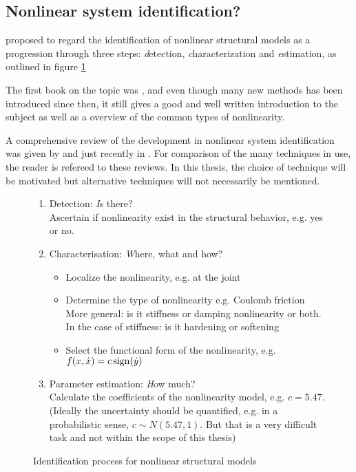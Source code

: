 \subsection{Nonlinear system identification?}
\label{sec:nonl-syst-ident}

\textcite{kerschen2006a} proposed to regard the identification of nonlinear
structural models as a progression through three steps: {\textit detection}, {\textit
  characterization} and {\textit estimation}, as outlined in figure
\ref{fig:ident_process}

The first book on the topic was \textcite{worden2000nonlinearity}, and even though
many new methods has been introduced since then, it still gives a good and well
written introduction to the subject as well as a overview of the common types of
nonlinearity.

A comprehensive review of the development in nonlinear system identification was
given by \autocite{kerschen2006a} and just recently in \textcite{noel2016a}. For
comparison of the many techniques in use, the reader is refereed to these
reviews. In this thesis, the choice of technique will be motivated but
alternative techniques will not necessarily be mentioned.



\begin{figure}[ht!]
  \centering
  \begin{mdframed}
    \begin{enumerate}
    \item Detection: {\textit Is there?}\\
      Ascertain if nonlinearity exist in the structural behavior, e.g. yes or
      no.
    \item Characterisation: {\textit Where, what and how?}
      \begin{itemize}
      \item Localize the nonlinearity, e.g. at the joint
      \item Determine the type of nonlinearity e.g.  Coulomb friction\\
        More general: is it stiffness or damping nonlinearity or both. In the
        case of stiffness: is it hardening or softening
      \item Select the functional form of the nonlinearity, e.g.
        $f(x,\dot x) = c \operatorname{sign} (\dot y)$
      \end{itemize}
    \item Parameter estimation: {\textit How much?}\\
      Calculate the coefficients of the nonlinearity model, e.g. $c = 5.47$.\\
      (Ideally the uncertainty should be quantified, e.g. in a probabilistic
      sense, $c \sim N(5.47,1)$. But that is a very difficult task and not
      within the scope of this thesis)
    \end{enumerate}
  \end{mdframed}
  \caption{Identification process for nonlinear structural models}
  \label{fig:ident_process}
\end{figure}

